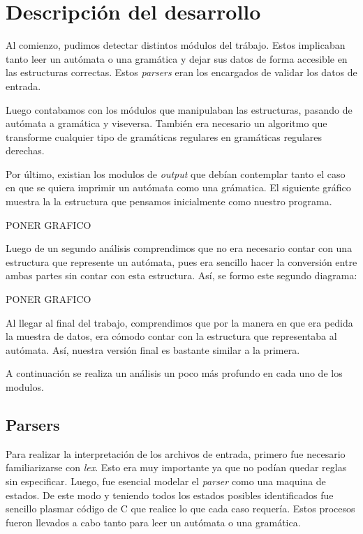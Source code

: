 \documentclass[a4paper,10pt]{article}
\begin{document}
\newpage

\section{Descripción del desarrollo}
    Al comienzo, pudimos detectar distintos módulos del trábajo. Estos implicaban tanto leer un autómata o una gramática
     y dejar sus datos de forma accesible en las estructuras correctas. Estos \textit{parsers} eran los encargados
      de validar los datos de entrada.
      
      Luego contabamos con los módulos que manipulaban las estructuras, pasando de autómata a gramática y viseversa.
      También era necesario un algoritmo que transforme cualquier tipo de gramáticas regulares en gramáticas 
       regulares derechas.

      Por último, existian los modulos de \textit{output} que debían contemplar tanto el caso en que se quiera imprimir
       un autómata como una grámatica.
      El siguiente gráfico muestra la la estructura que pensamos inicialmente como nuestro programa.

      PONER GRAFICO

      Luego de un segundo análisis comprendimos que no era necesario contar con una estructura que represente
       un autómata, pues era sencillo hacer la conversión entre ambas partes sin contar con esta estructura.
      Así, se formo este segundo diagrama:

      PONER GRAFICO

      Al llegar al final del trabajo, comprendimos que por la manera en que era pedida la muestra de datos,
       era cómodo contar con la estructura que representaba al autómata. Así, nuestra versión final es bastante similar
       a la primera.

      A continuación se realiza un análisis un poco más profundo en cada uno de los modulos.

      \newpage

      \subsection{Parsers}
            Para realizar la interpretación de los archivos de entrada, primero fue necesario familiarizarse con
            \textit{lex}. Esto era muy importante ya que no podían quedar reglas sin especificar. 
            Luego, fue esencial modelar el \textit{parser} como una maquina de estados. De este modo y teniendo
            todos los estados posibles identificados fue sencillo plasmar código de C que realice lo que cada caso
            requería. 
            Estos procesos fueron llevados a cabo tanto para leer un autómata o una gramática.
\end{document}
